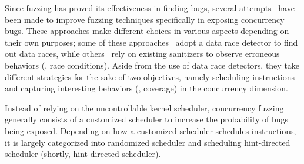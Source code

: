 
Since fuzzing has proved its effectiveness in finding bugs, several
attempts~\cite{razzer, krace, snowboard, muzz} have been made to
improve fuzzing techniques specifically in exposing concurrency bugs.
%
These approaches make different choices in various aspects depending
on their own purposes; some of these approaches~\cite{krace,
  snowboard} adopt a data race detector to find out data races, while
others~\cite{razzer, muzz} rely on existing sanitizers to observe
erroneous behaviors (\ie, race conditions).
%
Aside from the use of data race detectors, they take different
strategies for the sake of two objectives, namely scheduling
instructions and capturing interesting behaviors (\ie, coverage) in
the concurrency dimension.




%
Instead of relying on the uncontrollable kernel scheduler, concurrency
fuzzing generally consists of a customized scheduler to increase the
probability of bugs being exposed.
%
Depending on how a customized scheduler schedules instructions, it is
largely categorized into randomized scheduler and scheduling
hint-directed scheduler (shortly, hint-directed scheduler).

